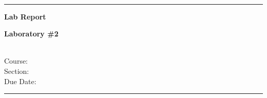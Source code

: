 \documentclass[12pt]{article}
\newcommand{\fullname}{}
\newcommand{\university}{}
\newcommand{\department}{}
\newcommand{\coursename}{}
\newcommand{\sectionname}{}
\newcommand{\duedate}{}
\newcommand{\labtitle}{}
\newcommand{\labnumber}{\#2}
\newif\iffigures
\newif\iftables
\newif\ifcode
\renewcommand\_{\textunderscore\allowbreak}
\begin{document}

\begin{titlepage}
    \begin{center}
    	\scriptsize \textbf{\university\\}
    	\bigskip

        \noindent\rule{\textwidth}{20pt}

        \mbox{}
        \vfill

        \Huge
        \color{UniColor}
        \textbf{Lab Report}

        \mbox{}
        \vfill

        \LARGE
        \textbf{Laboratory \labnumber}\\
        \color{black}
        \labtitle

        \mbox{}
        \vfill

		\normalsize
        \fullname\\
		\medskip
		Course: \coursename\\
		Section: \sectionname\\
		\medskip
		Due Date: \duedate

        \mbox{}
        \vfill

        \noindent\rule{\textwidth}{20pt}

        \bigskip
    	\scriptsize \textbf{\department\\}
    \end{center}
\end{titlepage}



\renewcommand\contentsname{Table of Contents}
\tableofcontents
\newpage

\iffigures
    \listoffigures
    \newpage
\fi

\iftables
    \listoftables
    \newpage
\fi

\ifcode
    \lstlistoflistings
    \newpage
\fi
















\end{document}
